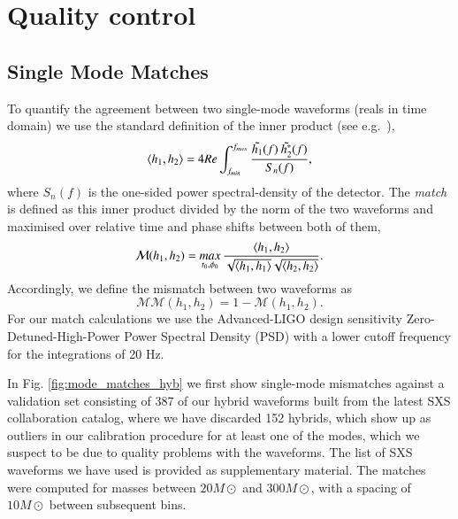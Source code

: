 \documentclass[twocolumn,prd,aps,superscriptaddress,preprintnumbers,tightenlines,showpacs,nofootinbib,eqsecnum,amsfonts,amsmath]{revtex4}
\begin{document}
\section{Quality control} \label{sec:quality}

\subsection{Single Mode Matches}

To quantify the agreement between two single-mode waveforms (reals in time domain) we use the standard definition of the inner product (see e.g.~\cite{Cutler:1994ys}),
\begin{equation}
\Braket{h_1, h_2} = 4 Re \int_{f_{min}}^{f_{max}} \frac{\tilde{h_1}(f) \:\tilde{h^*_2}(f)}{S_{n}(f)},
\end{equation}
where $S_{n}(f)$ is the one-sided power spectral-density of the detector. 
The \textit{match} is defined as this inner product divided by the norm of the two waveforms and maximised over relative time and phase shifts between both of them,
\begin{equation}
\mathcal{M}(h_1,h_2) = \mathop{max}_{t_0, \phi_0} \frac{\Braket{h_1, h_2}}{\sqrt{\Braket{h_1, h_1}}\sqrt{\Braket{h_2, h_2}}}.
\end{equation}
Accordingly, we define the mismatch between two waveforms as
\begin{equation}
\mathcal{MM}(h_1,h_2)=1-\mathcal{M}(h_1,h_2).
\end{equation}
For our match calculations we use the Advanced-LIGO design sensitivity Zero-Detuned-High-Power Power Spectral Density (PSD) \cite{TheLIGOScientific:2014jea,LIGOPSD} with a lower cutoff frequency for the integrations of 20 Hz. 

In Fig. \ref{fig:mode_matches_hyb} we first show single-mode mismatches against a validation set consisting of 387 of our hybrid waveforms built from the latest SXS collaboration catalog, where we have discarded 152 hybrids, which show up as outliers in our calibration procedure for at least one of the modes, which we suspect to be due to quality problems with the waveforms. The list of SXS waveforms we have used is provided as supplementary material. The matches were computed for masses between $20 M\odot$ and $300 M\odot$, with a spacing of $10 M\odot$ between subsequent bins. 
\end{document}
